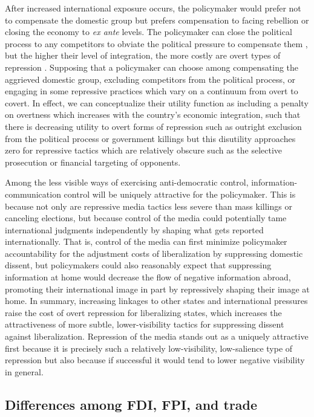 \documentclass[12pt,a4paper]{article}\usepackage[]{graphicx}\usepackage[]{color}
\begin{document}
After increased international exposure occurs, the policymaker would prefer not to compensate the domestic group but prefers compensation to facing rebellion or closing the economy to \emph{ex ante} levels. The policymaker can close the political process to any competitors to obviate the political pressure to compensate them \parencite{Adsera:2002vt}, but the higher their level of integration, the more costly are overt types of repression \parencite{Levitsky:2002gx}. Supposing that a policymaker can choose among compensating the aggrieved domestic group, excluding competitors from the political process, or engaging in some repressive practices which vary on a continuum from overt to covert. In effect, we can conceptualize their utility function as including a penalty on overtness which increases with the country's economic integration, such that there is decreasing utility to overt forms of repression such as outright exclusion from the political process or government killings but this disutility approaches zero for repressive tactics which are relatively obscure such as the selective prosecution or financial targeting of opponents.

Among the less visible ways of exercising anti-democratic control, information-communication control will be uniquely attractive for the policymaker. This is because not only are repressive media tactics less severe than mass killings or canceling elections, but because control of the media could potentially tame international judgments independently by shaping what gets reported internationally. That is, control of the media can first minimize policymaker accountability for the adjustment costs of liberalization by suppressing domestic dissent, but policymakers could also reasonably expect that suppressing information at home would decrease the flow of negative information abroad, promoting their international image in part by repressively shaping their image at home. In summary, increasing linkages to other states and international pressures raise the cost of overt repression for liberalizing states, which increases the attractiveness of more subtle, lower-visibility tactics for suppressing dissent against liberalization. Repression of the media stands out as a uniquely attractive first because it is precisely such a relatively low-visibility, low-salience type of repression but also because if successful it would tend to lower negative visibility in general.

\subsection{Differences among FDI, FPI, and trade}
\end{document}
